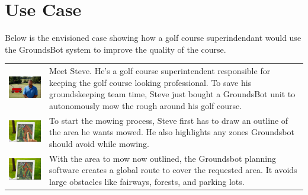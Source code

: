 \documentclass[12pt]{extarticle}
\begin{document}
\section{Use Case}
Below is the envisioned case showing how a golf course superindendant would use the GroundsBot system to improve the quality of the course.
\begin{table}[H]
  \def\arraystretch{4}
   \setlength\tabcolsep{8pt}


\begin{tabularx}{\textwidth}{cX}
\includegraphics[width=6cm, valign=t]{usecase1_1.png} & 
Meet Steve. He's a golf course superintendent responsible for keeping the golf course looking professional. To save his groundskeeping team time, Steve just bought a GroundsBot unit to autonomously mow the rough around his golf course. \\
\includegraphics[width=6cm, valign=t]{usecase1_2.png} &
To start the mowing process, Steve first has to draw an outline of the area he wants mowed. He also highlights any zones Groundsbot should avoid while mowing.
\\
\includegraphics[width=6cm, valign=t]{usecase1_3.png} &
With the area to mow now outlined, the Groundsbot planning software creates a global route to cover the requested area. It avoids large obstacles like fairways, forests, and parking lots.

\end{tabularx}
\end{table}
\end{document}
